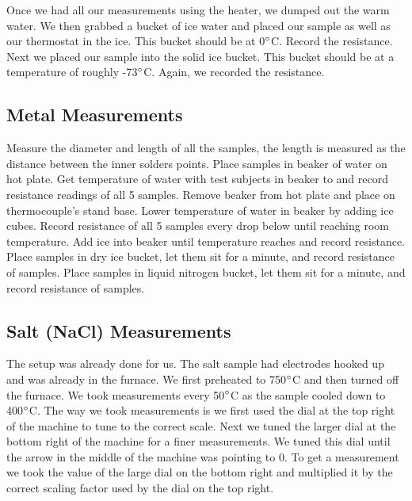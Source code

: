 \documentclass{article}
\begin{document}
Once we had all our measurements using the heater, we dumped out the warm water. We then grabbed a bucket of ice water and placed our sample as well as our thermostat in the ice. This bucket should be at 0$\degree$C. Record the resistance. Next we placed our sample into the solid ice bucket. This bucket should be at a temperature of roughly -73$\degree$C. Again, we recorded the resistance.

\subsection{Metal Measurements}
Measure the diameter and length of all the samples, the length is measured as the distance between the inner solders points. Place samples in beaker of water on hot plate. Get temperature of water with test subjects in beaker to  and record resistance readings of all 5 samples. Remove beaker from hot plate and place on thermocouple’s stand base. Lower temperature of water in beaker by adding ice cubes. Record resistance of all 5 samples every  drop below  until reaching room temperature. Add ice into beaker until temperature reaches  and record resistance.
Place samples in dry ice bucket, let them sit for a minute, and record resistance of samples. Place samples in liquid nitrogen bucket, let them sit for a minute, and record resistance of samples.

\subsection{Salt (NaCl) Measurements}
The setup was already done for us. The salt sample had electrodes hooked up and was already in the furnace. We first preheated to 750$\degree$C and then turned off the furnace. We took measurements every 50$\degree$C as the sample cooled down to 400$\degree$C. The way we took measurements is we first used the dial at the top right of the machine to tune to the correct scale. Next we tuned the larger dial at the bottom right of the machine for a finer measurements. We tuned this dial until the arrow in the middle of the machine was pointing to 0. To get a measurement we took the value of the large dial on the bottom right and multiplied it by the correct scaling factor used by the dial on the top right.
\end{document}
